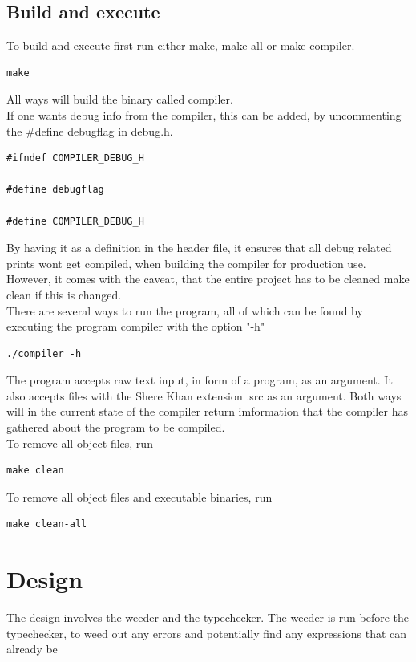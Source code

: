 \documentclass[a4paper,10pt,titlepage]{report}
\begin{document}
\subsection{Build and execute}
To build and execute first run either \textsf{make}, \textsf{make all} or \textsf{make compiler}.
\begin{lstlisting}
make
\end{lstlisting}
All ways will build the binary called \textsf{compiler}. \\
\vspace{6px}
If one wants debug info from the compiler, this can be added, by uncommenting the \textsf{\#define debugflag} in \textsf{debug.h}.
\begin{lstlisting}
#ifndef COMPILER_DEBUG_H

#define debugflag

#define COMPILER_DEBUG_H
\end{lstlisting}
By having it as a definition in the header file, it ensures that all debug related prints wont get compiled, when building the compiler for production use. However, it comes with the caveat, that the entire project has to be cleaned \textsf{make clean} if this is changed.\\
\vspace{6px}
There are several ways to run the program, all of which can be found by executing the program \textsf{compiler} with the option "\textsf{-h}"
\begin{lstlisting}
./compiler -h
\end{lstlisting}
The program accepts raw text input, in form of a program, as an argument. It also accepts files with the Shere Khan extension \textsf{.src} as an argument. Both ways will in the current state of the compiler return imformation that the compiler has gathered about the program to be compiled.\\
\vspace{6px}
To remove all object files, run
\begin{lstlisting}
make clean
\end{lstlisting}
To remove all object files and executable binaries, run
\begin{lstlisting}
make clean-all
\end{lstlisting}


\section{Design}
The design involves the weeder and the typechecker. The weeder is run before the typechecker, to weed out any errors and potentially find any expressions that can already be 
\end{document}
